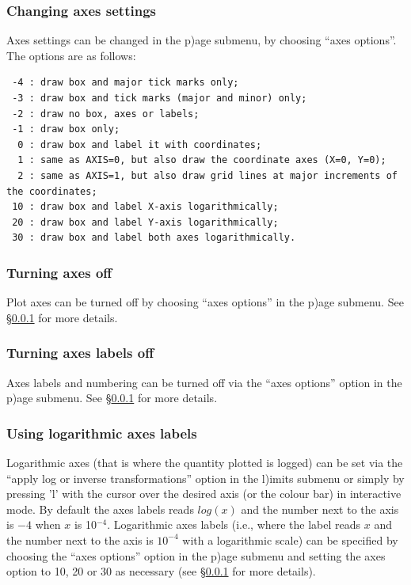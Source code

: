 \documentclass[a4paper,10pt]{article}
\begin{document}
\subsubsection{ Changing axes settings}
\label{sec:axessettings}
 Axes settings can be changed in the p)age submenu, by choosing ``axes options''. The options are as follows:
\begin{verbatim}
 -4 : draw box and major tick marks only;
 -3 : draw box and tick marks (major and minor) only;
 -2 : draw no box, axes or labels;
 -1 : draw box only;
  0 : draw box and label it with coordinates;
  1 : same as AXIS=0, but also draw the coordinate axes (X=0, Y=0);
  2 : same as AXIS=1, but also draw grid lines at major increments of the coordinates;
 10 : draw box and label X-axis logarithmically;
 20 : draw box and label Y-axis logarithmically;
 30 : draw box and label both axes logarithmically.
\end{verbatim}

\subsubsection{ Turning axes off}
 Plot axes can be turned off by choosing ``axes options'' in the p)age submenu. See \S\ref{sec:axessettings} for more details. 

\subsubsection{ Turning axes labels off}
 Axes labels and numbering can be turned off via the ``axes options'' option in the p)age submenu. See \S\ref{sec:axessettings} for more details. 

\subsubsection{ Using logarithmic axes labels}
\label{sec:loglabels}
 Logarithmic axes (that is where the quantity plotted is logged) can be set via the ``apply log or inverse transformations'' option in the l)imits submenu or simply by pressing 'l' with the cursor over the desired axis (or the colour bar) in interactive mode. By default the axes labels reads $log(x)$ and the number next to the axis is $-4$ when $x$ is 10$^{-4}$. Logarithmic axes labels (i.e., where the label reads $x$ and the number next to the axis is $10^{-4}$ with a logarithmic scale) can be specified by choosing the ``axes options'' option in the p)age submenu and setting the axes option to 10, 20 or 30 as necessary (see \S\ref{sec:axessettings} for more details). 
\end{document}
